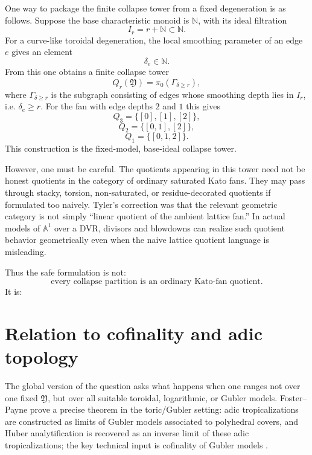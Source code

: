 \documentclass[11pt]{article}
\newcommand{\A}{\mathbb A}
\newcommand{\N}{\mathbb N}
\newcommand{\mfY}{\mathfrak Y}
\begin{document}
One way to package the finite collapse tower from a fixed degeneration is as follows. Suppose the base characteristic monoid is $\N$, with its ideal filtration
\[
I_r=r+\N\subset \N.
\]
For a curve-like toroidal degeneration, the local smoothing parameter of an edge $e$ gives an element
\[
\delta_e\in \N.
\]
From this one obtains a finite collapse tower
\[
Q_r(\mfY)=\pi_0(\Gamma_{\delta\ge r}),
\]
where $\Gamma_{\delta\ge r}$ is the subgraph consisting of edges whose smoothing depth lies in $I_r$, i.e. $\delta_e\ge r$. For the fan with edge depths $2$ and $1$ this gives
\[
Q_3=\{[0],[1],[2]\},
\]
\[
Q_2=\{[0,1],[2]\},
\]
\[
Q_1=\{[0,1,2]\}.
\]
This construction is the fixed-model, base-ideal collapse tower.

However, one must be careful. The quotients appearing in this tower need not be honest quotients in the category of ordinary saturated Kato fans. They may pass through stacky, torsion, non-saturated, or residue-decorated quotients if formulated too naively. Tyler's correction was that the relevant geometric category is not simply ``linear quotient of the ambient lattice fan.'' In actual models of $\A^1$ over a DVR, divisors and blowdowns can realize such quotient behavior geometrically even when the naive lattice quotient language is misleading.

Thus the safe formulation is not:
\[
\text{every collapse partition is an ordinary Kato-fan quotient.}
\]
It is:
\begin{center}
\end{center}

\section{Relation to cofinality and adic topology}

The global version of the question asks what happens when one ranges not over one fixed $\mfY$, but over all suitable toroidal, logarithmic, or Gubler models. Foster--Payne prove a precise theorem in the toric/Gubler setting: adic tropicalizations are constructed as limits of Gubler models associated to polyhedral covers, and Huber analytification is recovered as an inverse limit of these adic tropicalizations; the key technical input is cofinality of Gubler models \cite{FosterPayneAdicTropicalizations,FosterIntroAdicTropicalization}.
\end{document}
